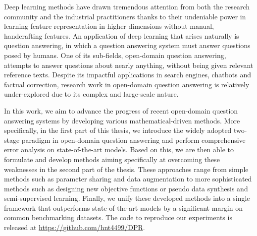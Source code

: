 \documentclass[12pt,a4paper,oneside]{Thesis} %
\begin{document}



Deep learning methods have drawn tremendous attention from both the research community and the industrial practitioners thanks to their undeniable power in learning feature representation in higher dimensions without manual, handcrafting features.
%
An application of deep learning that arises naturally is question answering, in which a question answering system must answer questions posed by humans.
%
One of its sub-fields, open-domain question answering, attempts to answer questions about nearly anything, without being given relevant reference texts.
%
Despite its impactful applications in search engines, chatbots and factual correction, research work in open-domain question answering is relatively under-explored due to its complex and large-scale nature.

%
In this work, we aim to advance the progress of recent open-domain question answering systems by developing various mathematical-driven methods.
%
More specifically, in the first part of this thesis, we introduce the widely adopted two-stage paradigm in open-domain question answering and perform comprehensive error analysis on state-of-the-art models.
%
Based on this, we are then able to formulate and develop methods aiming specifically at overcoming these weaknesses in the second part of the thesis.
%
These approaches range from simple methods such as parameter sharing and data augmentation to more sophisticated methods such as designing new objective functions or pseudo data synthesis and semi-supervised learning.
%
Finally, we unify these developed methods into a single framework that outperforms state-of-the-art models by a significant margin on common benchmarking datasets.
%
The code to reproduce our experiments is released at \url{https://github.com/hnt4499/DPR}.




\pagestyle{fancy} %
\end{document}
